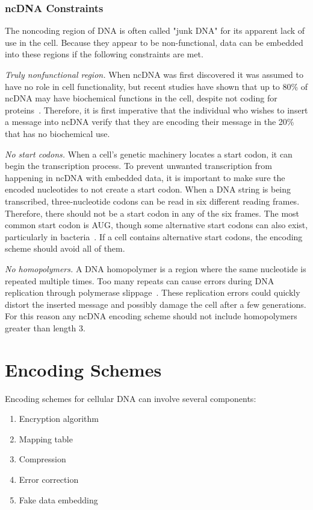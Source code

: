 \documentclass[USenglish,oneside,twocolumn]{article}
\begin{document}
\subsubsection{ncDNA Constraints}

The noncoding region of DNA is often called "junk DNA" for its apparent lack of use in the cell. Because they appear to be non-functional, data can be embedded into these regions if the following constraints are met.

\textit{Truly nonfunctional region.} When ncDNA was first discovered it was assumed to have no role in cell functionality, but recent studies have shown that up to 80\% of ncDNA may have biochemical functions in the cell, despite not coding for proteins~\cite{EPC2012N}. Therefore, it is first imperative that the individual who wishes to insert a message into ncDNA verify that they are encoding their message in the 20\% that has no biochemical use.

\textit{No start codons.} When a cell's genetic machinery locates a start codon, it can begin the transcription process. To prevent unwanted transcription from happening in ncDNA with embedded data, it is important to make sure the encoded nucleotides to not create a start codon. When a DNA string is being transcribed, three-nucleotide codons can be read in six different reading frames. Therefore, there should not be a start codon in any of the six frames. The most common start codon is AUG, though some alternative start codons can also exist, particularly in bacteria~\cite{B1997S}. If a cell contains alternative start codons, the encoding scheme should avoid all of them.

\textit{No homopolymers.} A DNA homopolymer is a region where the same nucleotide is repeated multiple times. Too many repeats can cause errors during DNA replication through polymerase slippage~\cite{VCE2001TEJ}. These replication errors could quickly distort the inserted message and possibly damage the cell after a few generations. For this reason any ncDNA encoding scheme should not include homopolymers greater than length 3.


\section{Encoding Schemes}

Encoding schemes for cellular DNA can involve several components:

\begin{enumerate}
\item Encryption algorithm
\item Mapping table
\item Compression
\item Error correction
\item Fake data embedding
\end{enumerate}
\end{document}
